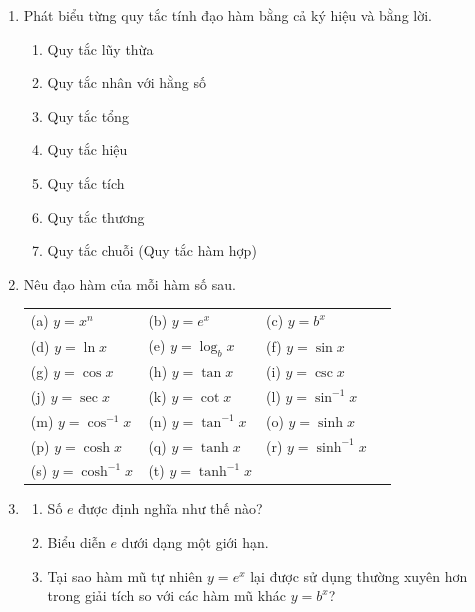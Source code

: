 \noindent
\begin{minipage}[t]{0.485\textwidth}
\begin{enumerate}[label=\textbf{\arabic*.}, leftmargin=14pt, itemsep=4.5pt, topsep=0pt]
    \item Phát biểu từng quy tắc tính đạo hàm bằng cả ký hiệu và bằng lời.
    \begin{enumerate}[label=(\alph*), leftmargin=16pt, itemsep=1pt, topsep=1.5pt]
        \item Quy tắc lũy thừa
        \item Quy tắc nhân với hằng số
        \item Quy tắc tổng
        \item Quy tắc hiệu
        \item Quy tắc tích
        \item Quy tắc thương
        \item Quy tắc chuỗi (Quy tắc hàm hợp)
    \end{enumerate}

    \item Nêu đạo hàm của mỗi hàm số sau.
    \vspace{1.5pt}
    
    \begingroup
    \small
    \renewcommand{\arraystretch}{1.18}
    \setlength{\tabcolsep}{2pt}
    \begin{tabular}{@{}p{0.32\linewidth}p{0.32\linewidth}p{0.36\linewidth}@{}}
        (a) $y = x^n$ & (b) $y = e^x$ & (c) $y = b^x$ \\
        (d) $y = \ln x$ & (e) $y = \log_b x$ & (f) $y = \sin x$ \\
        (g) $y = \cos x$ & (h) $y = \tan x$ & (i) $y = \csc x$ \\
        (j) $y = \sec x$ & (k) $y = \cot x$ & (l) $y = \sin^{-1} x$ \\
        (m) $y = \cos^{-1} x$ & (n) $y = \tan^{-1} x$ & (o) $y = \sinh x$ \\
        (p) $y = \cosh x$ & (q) $y = \tanh x$ & (r) $y = \sinh^{-1} x$ \\
        (s) $y = \cosh^{-1} x$ & (t) $y = \tanh^{-1} x$ & 
    \end{tabular}
    \endgroup

    \item 
    \begin{enumerate}[label=(\alph*), leftmargin=16pt, itemsep=1.5pt, topsep=1.5pt]
        \item Số $e$ được định nghĩa như thế nào?
        \item Biểu diễn $e$ dưới dạng một giới hạn.
        \item Tại sao hàm mũ tự nhiên $y = e^x$ lại được sử dụng thường xuyên hơn trong giải tích so với các hàm mũ khác $y = b^x$?
    \end{enumerate}
\end{enumerate}
\end{minipage}%
